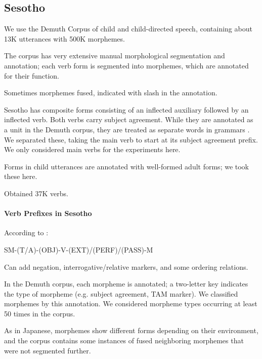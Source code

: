 \documentclass[11pt,letterpaper]{article}
\begin{document}





\subsection{Sesotho}

\cite{doke1967textbook}

We use the Demuth Corpus \cite{demuth1992acquisition} of child and child-directed speech, containing about 13K utterances with 500K morphemes.


The corpus has very extensive manual morphological segmentation and annotation; each verb form is segmented into morphemes, which are annotated for their function.

Sometimes morphemes fused, indicated with slash in the annotation.

Sesotho has composite forms consisting of an inflected auxiliary followed by an inflected verb.
Both verbs carry subject agreement.
While they are annotated as a unit in the Demuth corpus, they are treated as separate words in grammars \citep{doke1967textbook,guma1971outline,lombard1969handbook}.
We separated these, taking the main verb to start at its subject agreement prefix.
We only considered main verbs for the experiments here.

Forms in child utterances are annotated with well-formed adult forms; we took these here.


Obtained 37K verbs.


\paragraph{Verb Prefixes in Sesotho}


According to \cite{demuth1992acquisition}:
 
 SM-(T/A)-(OBJ)-V-(EXT)/(PERF)/(PASS)-M 

Can add negation, interrogative/relative markers, and some ordering relations.
 

In the Demuth corpus, each morpheme is annotated; a two-letter key indicates the type of morpheme (e.g. subject agreement, TAM marker).
We classified morphemes by this annotation.
We considered morpheme types occurring at least 50 times in the corpus.

As in Japanese, morphemes show different forms depending on their environment, and the corpus contains some instances of fused neighboring morphemes that were not segmented further.
\end{document}
